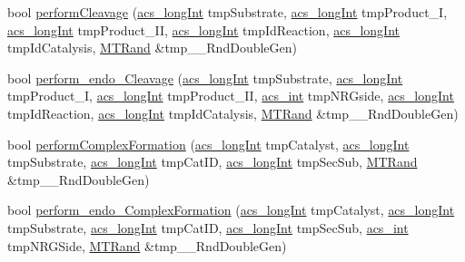 \begin{DoxyCompactItemize}
\item 
bool \hyperlink{a00013_aa4ed307a123c402166cfc7f6ed99043a}{perform\+Cleavage} (\hyperlink{a00050_a19319d75f02db4308bc5c0026d98cd85}{acs\+\_\+long\+Int} tmp\+Substrate, \hyperlink{a00050_a19319d75f02db4308bc5c0026d98cd85}{acs\+\_\+long\+Int} tmp\+Product\+\_\+\+I, \hyperlink{a00050_a19319d75f02db4308bc5c0026d98cd85}{acs\+\_\+long\+Int} tmp\+Product\+\_\+\+I\+I, \hyperlink{a00050_a19319d75f02db4308bc5c0026d98cd85}{acs\+\_\+long\+Int} tmp\+Id\+Reaction, \hyperlink{a00050_a19319d75f02db4308bc5c0026d98cd85}{acs\+\_\+long\+Int} tmp\+Id\+Catalysis, \hyperlink{a00015}{M\+T\+Rand} \&tmp\+\_\+\+\_\+\+Rnd\+Double\+Gen)
\item 
bool \hyperlink{a00013_ade26b82a3b48a5bda7e5751cbfd31b04}{perform\+\_\+endo\+\_\+\+Cleavage} (\hyperlink{a00050_a19319d75f02db4308bc5c0026d98cd85}{acs\+\_\+long\+Int} tmp\+Substrate, \hyperlink{a00050_a19319d75f02db4308bc5c0026d98cd85}{acs\+\_\+long\+Int} tmp\+Product\+\_\+\+I, \hyperlink{a00050_a19319d75f02db4308bc5c0026d98cd85}{acs\+\_\+long\+Int} tmp\+Product\+\_\+\+I\+I, \hyperlink{a00050_a8d277355641a098190360234e2ebde35}{acs\+\_\+int} tmp\+N\+R\+Gside, \hyperlink{a00050_a19319d75f02db4308bc5c0026d98cd85}{acs\+\_\+long\+Int} tmp\+Id\+Reaction, \hyperlink{a00050_a19319d75f02db4308bc5c0026d98cd85}{acs\+\_\+long\+Int} tmp\+Id\+Catalysis, \hyperlink{a00015}{M\+T\+Rand} \&tmp\+\_\+\+\_\+\+Rnd\+Double\+Gen)
\item 
bool \hyperlink{a00013_aaf4f4f6be28edb182d2a2516c9394f9b}{perform\+Complex\+Formation} (\hyperlink{a00050_a19319d75f02db4308bc5c0026d98cd85}{acs\+\_\+long\+Int} tmp\+Catalyst, \hyperlink{a00050_a19319d75f02db4308bc5c0026d98cd85}{acs\+\_\+long\+Int} tmp\+Substrate, \hyperlink{a00050_a19319d75f02db4308bc5c0026d98cd85}{acs\+\_\+long\+Int} tmp\+Cat\+I\+D, \hyperlink{a00050_a19319d75f02db4308bc5c0026d98cd85}{acs\+\_\+long\+Int} tmp\+Sec\+Sub, \hyperlink{a00015}{M\+T\+Rand} \&tmp\+\_\+\+\_\+\+Rnd\+Double\+Gen)
\item 
bool \hyperlink{a00013_ae942db2453c56b60250a5d43452b91a5}{perform\+\_\+endo\+\_\+\+Complex\+Formation} (\hyperlink{a00050_a19319d75f02db4308bc5c0026d98cd85}{acs\+\_\+long\+Int} tmp\+Catalyst, \hyperlink{a00050_a19319d75f02db4308bc5c0026d98cd85}{acs\+\_\+long\+Int} tmp\+Substrate, \hyperlink{a00050_a19319d75f02db4308bc5c0026d98cd85}{acs\+\_\+long\+Int} tmp\+Cat\+I\+D, \hyperlink{a00050_a19319d75f02db4308bc5c0026d98cd85}{acs\+\_\+long\+Int} tmp\+Sec\+Sub, \hyperlink{a00050_a8d277355641a098190360234e2ebde35}{acs\+\_\+int} tmp\+N\+R\+G\+Side, \hyperlink{a00015}{M\+T\+Rand} \&tmp\+\_\+\+\_\+\+Rnd\+Double\+Gen)

\end{DoxyCompactItemize}
